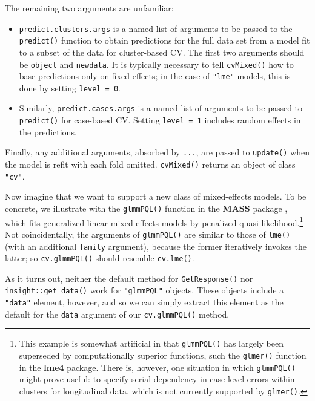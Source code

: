 \documentclass[
]{jss}
\begin{document}
The remaining two arguments are unfamiliar:

\begin{itemize}
\item
  \texttt{predict.clusters.args} is a named list of arguments to be
  passed to the \texttt{predict()} function to obtain predictions for
  the full data set from a model fit to a subset of the data for
  cluster-based CV. The first two arguments should be \texttt{object}
  and \texttt{newdata}. It is typically necessary to tell
  \texttt{cvMixed()} how to base predictions only on fixed effects; in
  the case of \texttt{"lme"} models, this is done by setting
  \texttt{level\ =\ 0}.
\item
  Similarly, \texttt{predict.cases.args} is a named list of arguments to
  be passed to \texttt{predict()} for case-based CV. Setting
  \texttt{level\ =\ 1} includes random effects in the predictions.
\end{itemize}

Finally, any additional arguments, absorbed by \texttt{...}, are passed
to \texttt{update()} when the model is refit with each fold omitted.
\texttt{cvMixed()} returns an object of class \texttt{"cv"}.

Now imagine that we want to support a new class of mixed-effects models.
To be concrete, we illustrate with the \texttt{glmmPQL()} function in
the \textbf{MASS} package \citep{VenablesRipley:2002}, which fits
generalized-linear mixed-effects models by penalized
quasi-likelihood.\footnote{This example is somewhat artificial in that
  \texttt{glmmPQL()} has largely been superseded by computationally
  superior functions, such the \texttt{glmer()} function in the
  \textbf{lme4} package. There is, however, one situation in which
  \texttt{glmmPQL()} might prove useful: to specify serial dependency in
  case-level errors within clusters for longitudinal data, which is not
  currently supported by \texttt{glmer()}.} Not coincidentally, the
arguments of \texttt{glmmPQL()} are similar to those of \texttt{lme()}
(with an additional \texttt{family} argument), because the former
iteratively invokes the latter; so \texttt{cv.glmmPQL()} should resemble
\texttt{cv.lme()}.

As it turns out, neither the default method for \texttt{GetResponse()}
nor \texttt{insight::get\_data()} work for \texttt{"glmmPQL"} objects.
These objects include a \texttt{"data"} element, however, and so we can
simply extract this element as the default for the \texttt{data}
argument of our \texttt{cv.glmmPQL()} method.
\end{document}
